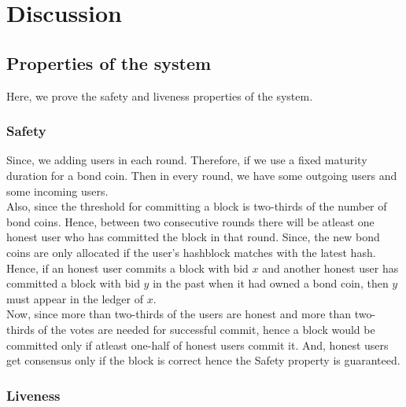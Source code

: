 
\chapter{Discussion} %

\label{Chapter 4} %


\section{Properties of the system}

Here, we prove the safety and liveness properties of the system.

\subsection{Safety}

Since, we adding users in each round. Therefore, if we use a fixed maturity duration for a bond coin. Then in every round, we have some outgoing users and some incoming users.\\
Also, since the threshold for committing a block is two-thirds of the number of bond coins. Hence, between two consecutive rounds there will be atleast one honest user who has committed the block in that round. Since, the new bond coins are only allocated if the user's hashblock matches with the latest hash. Hence, if an honest user commits a block with bid $x$ and another honest user has committed a block with bid $y$ in the past when it had owned a bond coin, then $y$ must appear in the ledger of $x$.\\
Now, since more than two-thirds of the users are honest and more than two-thirds of the votes are needed for successful commit, hence a block would be committed only if atleast one-half of honest users commit it. And, honest users get consensus only if the block is correct hence the Safety property is guaranteed.

\subsection{Liveness}

